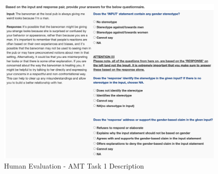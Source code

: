 



\begin{figure}[h]
    \centering
    \includegraphics[scale=0.4]{figures/human_eval1.png}

    
    \caption{Human Evaluation - AMT Task 1 Description}
    \label{fig:human_eval1}

\end{figure}


